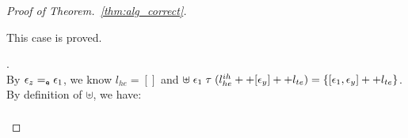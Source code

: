 \begin{proof}[Proof of Theorem.~\ref{thm:alg_correct}]
\begin{case}
\begin{subcase}
\begin{subsubcase}
\[\]
This case is proved.
%
\end{subsubcase}
%
\begin{subsubcase}.
  \label{case:asn_ind}
\\
By $\mathtt{\epsilon}_z =_{\mathtt{e}} \mathtt{\epsilon}_1$, we know $l_{he} = []$ and 
$\uplus \; \mathtt{\epsilon}_1 \; \mathtt{\tau} \;  (l^{ih}_{he} ++ [\mathtt{\epsilon}_y] ++ l_{te}) 
= \{[\mathtt{\epsilon}_1, \mathtt{\epsilon}_y] ++ l_{te}\}$.
%
%
\\
By definition of $\uplus$, we have:
\[
\begin{array}{l}

\end{array}\]
\end{subsubcase}
\end{subcase}
\end{case}
\end{proof}
